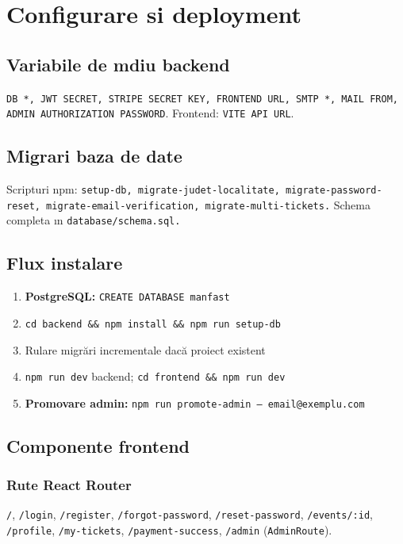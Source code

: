 \section{Configurare si deployment}
\subsection{Variabile de mdiu backend}

{\tt DB *, JWT SECRET, STRIPE SECRET KEY, FRONTEND URL, SMTP *, MAIL FROM,
ADMIN AUTHORIZATION PASSWORD}. Frontend: {\tt VITE API URL}.

\subsection{Migrari baza de date}

Scripturi npm: {\tt setup-db, migrate-judet-localitate, migrate-password-reset, migrate-email-verification, migrate-multi-tickets.} Schema completa ın {\tt database/schema.sql.}

\subsection{Flux instalare}

\begin{enumerate}
	\item \textbf{PostgreSQL:} \texttt{CREATE DATABASE manfast}
	\item \texttt{cd backend \&\& npm install \&\& npm run setup-db}
	\item Rulare migrări incrementale dacă proiect existent
	\item \texttt{npm run dev} backend; \texttt{cd frontend \&\& npm run dev}
	\item \textbf{Promovare admin:} \texttt{npm run promote-admin -- email@exemplu.com}
\end{enumerate}

\subsection{Componente frontend}

\subsubsection{Rute React Router}
\texttt{/}, \texttt{/login}, \texttt{/register}, \texttt{/forgot-password}, \texttt{/reset-password}, \texttt{/events/:id}, \texttt{/profile}, \texttt{/my-tickets}, \texttt{/payment-success}, \texttt{/admin} (\texttt{AdminRoute}).

